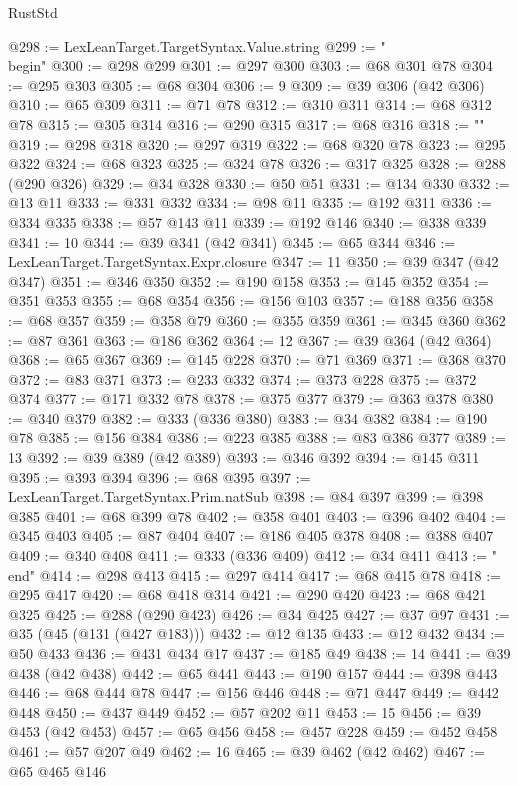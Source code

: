 \begin{lexlean}{RustStd}
\begin{coremodule}
@298 := LexLeanTarget.TargetSyntax.Value.string
@299 := "\\begin{"
@300 := @298 @299
@301 := @297 @300
@303 := @68 @301 @78
@304 := @295 @303
@305 := @68 @304
@306 := 9
@309 := @39 @306 (@42 @306)
@310 := @65 @309
@311 := @71 @78
@312 := @310 @311
@314 := @68 @312 @78
@315 := @305 @314
@316 := @290 @315
@317 := @68 @316
@318 := "}"
@319 := @298 @318
@320 := @297 @319
@322 := @68 @320 @78
@323 := @295 @322
@324 := @68 @323
@325 := @324 @78
@326 := @317 @325
@328 := @288 (@290 @326)
@329 := @34 @328
@330 := @50 @51
@331 := @134 @330
@332 := @13 @11
@333 := @331 @332
@334 := @98 @11
@335 := @192 @311
@336 := @334 @335
@338 := @57 @143 @11
@339 := @192 @146
@340 := @338 @339
@341 := 10
@344 := @39 @341 (@42 @341)
@345 := @65 @344
@346 := LexLeanTarget.TargetSyntax.Expr.closure
@347 := 11
@350 := @39 @347 (@42 @347)
@351 := @346 @350
@352 := @190 @158
@353 := @145 @352
@354 := @351 @353
@355 := @68 @354
@356 := @156 @103
@357 := @188 @356
@358 := @68 @357
@359 := @358 @79
@360 := @355 @359
@361 := @345 @360
@362 := @87 @361
@363 := @186 @362
@364 := 12
@367 := @39 @364 (@42 @364)
@368 := @65 @367
@369 := @145 @228
@370 := @71 @369
@371 := @368 @370
@372 := @83 @371
@373 := @233 @332
@374 := @373 @228
@375 := @372 @374
@377 := @171 @332 @78
@378 := @375 @377
@379 := @363 @378
@380 := @340 @379
@382 := @333 (@336 @380)
@383 := @34 @382
@384 := @190 @78
@385 := @156 @384
@386 := @223 @385
@388 := @83 @386 @377
@389 := 13
@392 := @39 @389 (@42 @389)
@393 := @346 @392
@394 := @145 @311
@395 := @393 @394
@396 := @68 @395
@397 := LexLeanTarget.TargetSyntax.Prim.natSub
@398 := @84 @397
@399 := @398 @385
@401 := @68 @399 @78
@402 := @358 @401
@403 := @396 @402
@404 := @345 @403
@405 := @87 @404
@407 := @186 @405 @378
@408 := @388 @407
@409 := @340 @408
@411 := @333 (@336 @409)
@412 := @34 @411
@413 := "\\end{"
@414 := @298 @413
@415 := @297 @414
@417 := @68 @415 @78
@418 := @295 @417
@420 := @68 @418 @314
@421 := @290 @420
@423 := @68 @421 @325
@425 := @288 (@290 @423)
@426 := @34 @425
@427 := @37 @97
@431 := @35 (@45 (@131 (@427 @183)))
@432 := @12 @135
@433 := @12 @432
@434 := @50 @433
@436 := @431 @434 @17
@437 := @185 @49
@438 := 14
@441 := @39 @438 (@42 @438)
@442 := @65 @441
@443 := @190 @157
@444 := @398 @443
@446 := @68 @444 @78
@447 := @156 @446
@448 := @71 @447
@449 := @442 @448
@450 := @437 @449
@452 := @57 @202 @11
@453 := 15
@456 := @39 @453 (@42 @453)
@457 := @65 @456
@458 := @457 @228
@459 := @452 @458
@461 := @57 @207 @49
@462 := 16
@465 := @39 @462 (@42 @462)
@467 := @65 @465 @146
}
\end{coremodule}
\end{lexlean}
